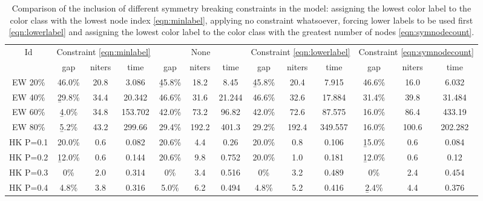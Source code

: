 \begin{table}

\centering

\begin{tabular}{|c|ccc|ccc|ccc|ccc|}
\hline
\multicolumn{1}{|c|}{Id} & \multicolumn{3}{|c|}{Constraint \ref{eqn:minlabel}} & \multicolumn{3}{|c|}{None} & \multicolumn{3}{|c|}{Constraint \ref{eqn:lowerlabel}} & \multicolumn{3}{|c|}{Constraint \ref{eqn:symnodecount}}
\\
 & gap & niters & time & gap & niters & time & gap & niters & time & gap & niters & time
\\
\hline
EW 20\% & 46.0\% & 20.8 & 3.086 & \b{45.8\%} & 18.2 & 8.45 & \b{45.8\%} & 20.4 & 7.915 &46.6\% & 16.0 & 6.032
\\
EW 40\% & \b{29.8\%} & 34.4 & 20.342 &46.6\% & 31.6 & 21.244 &46.6\% & 32.6 & 17.884 &31.4\% & 39.8 & 31.484
\\
EW 60\% & \b{4.0\%} & 34.8 & 153.702 & 42.0\% & 73.2 & 96.82 & 42.0\% & 72.6 & 87.575 & 16.0\% & 86.4 & 433.19
\\
EW 80\% & \b{5.2\%} & 43.2 & 299.66 &29.4\% & 192.2 & 401.3 &29.2\% & 192.4 & 349.557 & 16.0\% & 100.6 & 202.282
\\
\hline
HK P=0.1 &  20.0\% &  0.6 & 0.082 & 20.6\% &  4.4 & 0.26 &  20.0\% &  0.8 & 0.106 & \b{15.0\%} &  0.6 & 0.084
\\
HK P=0.2 & \b{12.0\%} &  0.6 & 0.144 & 20.6\% &  9.8 & 0.752 &  20.0\% &  1.0 & 0.181 & \b{12.0\%} &  0.6 & 0.12
\\
HK P=0.3 &  0\% &  2.0 & 0.314 &  0\% &  3.4 & 0.516 & 0\% &  3.2 & 0.489 & 0\% &  2.4 & 0.454
\\
HK P=0.4 & 4.8\% &  3.8 & 0.316 & 5.0\% &  6.2 & 0.494 & 4.8\% &  5.2 & 0.416 & \b{2.4\%} &  4.4 & 0.376
\\
\hline 
 \end{tabular}

\caption{Comparison of the inclusion of different symmetry breaking constraints in the model: assigning the lowest color label to the color class with the lowest node index \eqref{eqn:minlabel}, applying no constraint whatsoever, forcing lower labels to be used first \eqref{eqn:lowerlabel} and assigning the lowest color label to the color class with the greatest number of nodes \eqref{eqn:symnodecount}.}
\label{table:models:sym}

\end{table}

